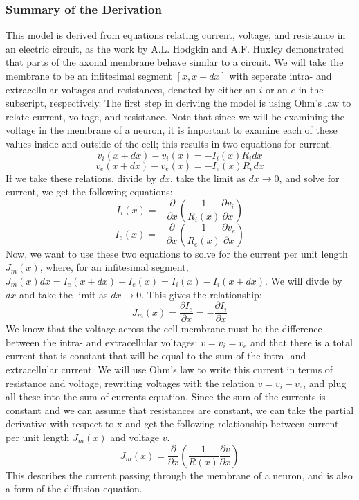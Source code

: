 \documentclass[12pt]{article}
\begin{document}
\subsubsection{Summary of the Derivation}
This model is derived from equations relating current, voltage, and resistance in an electric circuit, as the work by A.L. Hodgkin and A.F. Huxley demonstrated that parts of the axonal membrane behave similar to a circuit. We will take the membrane to be an infitesimal segment $[x, x+dx]$ with seperate intra- and extracellular voltages and resistances, denoted by either an $i$ or an $e$ in the subscript, respectively. The first step in deriving the model is using Ohm's law to relate current, voltage, and resistance. Note that since we will be examining the voltage in the membrane of a neuron, it is important to examine each of these values inside and outside of the cell; this results in two equations for current. 
\[v_i(x+dx)-v_i(x)=-I_i(x)R_idx\]
\[v_e(x+dx)-v_e(x)=-I_e(x)R_edx\]
If we take these relations, divide by $dx$,  take the limit as $dx\rightarrow 0$, and solve for current, we get the following equations:
\[I_i(x)=-\frac{\partial}{\partial{x}}(\frac{1}{R_i(x)}\frac{\partial{v_i}}{\partial{x}})\]
\[I_e(x)=-\frac{\partial}{\partial{x}}(\frac{1}{R_e(x)}\frac{\partial{v_e}}{\partial{x}})\]
Now, we want to use these two equations to solve for the current per unit length $J_m(x)$, where, for an infitesimal segment, $J_m(x)dx=I_e(x+dx)-I_e(x)=I_i(x)-I_i(x+dx)$. We will divde by $dx$ and take the limit as $dx\rightarrow 0$. This gives the relationship:
\[J_m(x)=\frac{\partial{I_e}}{\partial{x}}=-\frac{\partial{I_i}}{\partial{x}}\]
We know that the voltage across the cell membrane must be the difference between the intra- and extracellular voltages: $v=v_i=v_e$ and that there is a total current that is constant that will be equal to the sum of the intra- and extracellular current. We will use Ohm's law to write this current in terms of resistance and voltage, rewriting voltages with the relation $v=v_i-v_e$, and plug all these into the sum of currents equation. Since the sum of the currents is constant and we can assume that resistances are constant, we can take the partial derivative with respect to x and get the following relationship between current per unit length $J_m(x)$ and voltage $v$.
\begin{equation} \label{2}
J_m(x)=\frac{\partial}{\partial{x}}(\frac{1}{R(x)}\frac{\partial{v}}{\partial{x}})
\end {equation}
This describes the current passing through the membrane of a neuron, and is also a form of the diffusion equation.\par
\end{document}
